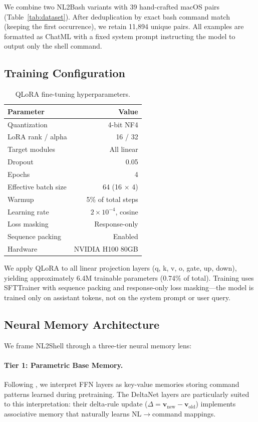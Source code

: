 \documentclass[11pt,a4paper]{article}
\begin{document}
We combine two NL2Bash variants with 39 hand-crafted macOS pairs (Table~\ref{tab:dataset}).
After deduplication by exact bash command match (keeping the first occurrence), we retain 11{,}894 unique pairs.
All examples are formatted as ChatML with a fixed system prompt instructing the model to output only the shell command.

\subsection{Training Configuration}

\begin{table}[t]
\centering
\small
\begin{tabular}{lr}
\toprule
\textbf{Parameter} & \textbf{Value} \\
\midrule
Quantization & 4-bit NF4 \\
LoRA rank / alpha & 16 / 32 \\
Target modules & All linear \\
Dropout & 0.05 \\
Epochs & 4 \\
Effective batch size & 64 (16 $\times$ 4) \\
Warmup & 5\% of total steps \\
Learning rate & $2 \times 10^{-4}$, cosine \\
Loss masking & Response-only \\
Sequence packing & Enabled \\
Hardware & NVIDIA H100 80GB \\
\bottomrule
\end{tabular}
\caption{QLoRA fine-tuning hyperparameters.}
\label{tab:config}
\end{table}

We apply QLoRA to all linear projection layers (q, k, v, o, gate, up, down), yielding approximately 6.4M trainable parameters (0.74\% of total).
Training uses SFTTrainer with sequence packing and response-only loss masking---the model is trained only on assistant tokens, not on the system prompt or user query.

\subsection{Neural Memory Architecture}
\label{sec:memory}

We frame NL2Shell through a three-tier neural memory lens:

\paragraph{Tier 1: Parametric Base Memory.}
Following \citet{geva2021}, we interpret FFN layers as key-value memories storing command patterns learned during pretraining.
The DeltaNet layers are particularly suited to this interpretation: their delta-rule update ($\Delta = \mathbf{v}_{\text{new}} - \mathbf{v}_{\text{old}}$) implements associative memory that naturally learns NL$\rightarrow$command mappings.
\end{document}
